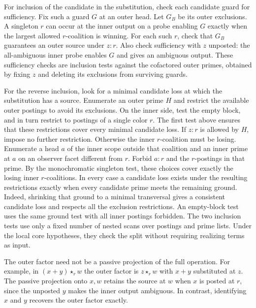 For inclusion of the candidate in the substitution, check each
candidate guard for sufficiency. Fix such a guard $G$ at an outer
head. Let $G_B$ be its outer exclusions. A singleton $r$ can occur
at the inner output on a probe enabling $G$ exactly when the
largest allowed $r$-coalition is winning. For each such $r$, check
that $G_B$ guarantees an outer source under $z:r$. Also check
sufficiency with $z$ unposted: the all-ambiguous inner probe
enables $G$ and gives an ambiguous output. These sufficiency
checks are inclusion tests against the cofactored outer primes,
obtained by fixing $z$ and deleting its exclusions from surviving
guards.

For the reverse inclusion, look for a minimal candidate loss at
which the substitution has a source. Enumerate an outer prime $H$
and restrict the available outer postings to avoid its exclusions.
On the inner side, test the empty block, and in turn restrict to
postings of a single color $r$. The first test above ensures that
these restrictions cover every minimal candidate loss. If $z:r$
is allowed by $H$, impose no further restriction. Otherwise the
inner $r$-coalition must be losing. Enumerate a head $a$ of the
inner scope outside that coalition and an inner prime at $a$ on
an observer facet different from $r$. Forbid $a:r$ and the
$r$-postings in that prime. By the monochromatic singleton test,
these choices cover exactly the losing inner $r$-coalitions.
In every case a candidate loss exists under the resulting
restrictions exactly when every candidate prime meets the
remaining ground. Indeed, shrinking that ground to a minimal
transversal gives a consistent candidate loss and respects
all the exclusion restrictions. An empty-block test uses the
same ground test with all inner postings forbidden. The two
inclusion tests use only a fixed number of nested scans over
postings and prime lists. Under the local core hypotheses, they
check the split without requiring realizing terms as input.

The outer factor need not be a passive projection of the full
operation. For example, in $(x+y)\star_r w$ the outer factor is
$z\star_r w$ with $x+y$ substituted at $z$. The passive projection
onto $x,w$ retains the source at $w$ when $x$ is posted at $r$,
since the unposted $y$ makes the inner output ambiguous. In contrast,
identifying $x$ and $y$ recovers the outer factor exactly.

